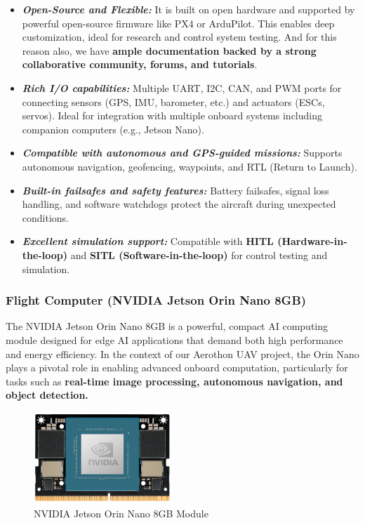 \documentclass[12pt]{report}
\begin{document}
      \begin{itemize}
        \item \textbf{\textit{Open-Source and Flexible:}} It is built on open hardware and supported by powerful open-source firmware like PX4 or ArduPilot. This enables deep customization, ideal for research and control system testing. And for this reason also, we have \textbf{ample documentation backed by a strong collaborative community, forums, and tutorials}.
        \item \textbf{\textit{Rich I/O capabilities:}} Multiple UART, I2C, CAN, and PWM ports for connecting sensors (GPS, IMU, barometer, etc.) and actuators (ESCs, servos). Ideal for integration with multiple onboard systems including companion computers (e.g., Jetson Nano).
        \item \textbf{\textit{Compatible with autonomous and GPS-guided missions:}}  Supports autonomous navigation, geofencing, waypoints, and RTL (Return to Launch).
        \item \textbf{\textit{Built-in failsafes and safety features:}} Battery failsafes, signal loss handling, and software watchdogs protect the aircraft during unexpected conditions.
        \item \textbf{\textit{Excellent simulation support:}} Compatible with \textbf{HITL (Hardware-in-the-loop)} and \textbf{SITL (Software-in-the-loop)} for control testing and simulation.
      \end{itemize}
      
      \subsubsection{\large Flight Computer (NVIDIA Jetson Orin Nano 8GB)}
      The NVIDIA Jetson Orin Nano 8GB is a powerful, compact AI computing module designed for edge AI applications that demand both high performance and energy efficiency. In the context of our Aerothon UAV project, the Orin Nano plays a pivotal role in enabling advanced onboard computation, particularly for tasks such as \textbf{real-time image processing, autonomous navigation, and object detection.} \\

      \begin{figure}[H]
        \centering 
        \includegraphics[width=0.459\textwidth]{jetson.png}
        \caption{NVIDIA Jetson Orin Nano 8GB Module}
        \label{fig:jetson}
      \end{figure}
\end{document}
